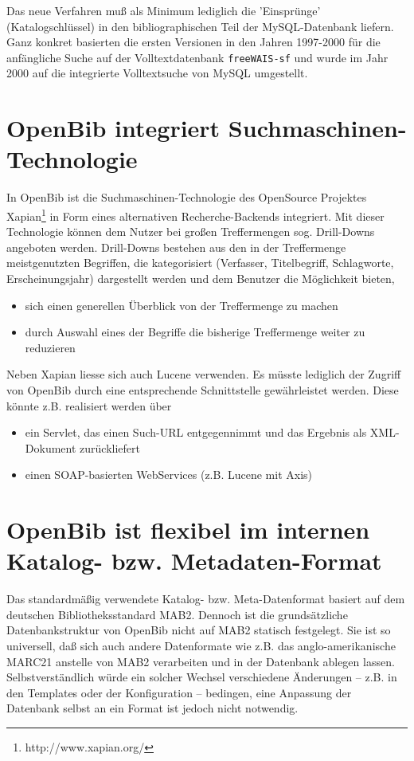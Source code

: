\documentclass[11pt, twoside, a4paper, BCOR8mm, DIV12, bibtotoc,idxtotoc]{scrbook}
\begin{document}
Das neue Verfahren muß als Minimum lediglich die 'Einsprünge'
(Katalogschlüssel) in den biblio\-gra\-phi\-schen Teil der MySQL-Datenbank
liefern. Ganz konkret basierten die ersten Versionen in den Jahren
1997-2000 für die anfängliche Suche auf der Volltextdatenbank
\texttt{freeWAIS-sf} und wurde im Jahr 2000 auf die integrierte
Volltextsuche von MySQL umgestellt.


\section{OpenBib integriert Suchmaschinen-Technologie}
In OpenBib ist die Suchmaschinen-Technologie des OpenSource Projektes
Xapian\footnote{http://www.xapian.org/} in Form eines alternativen
Recherche-Backends integriert. Mit dieser Technologie können dem Nutzer bei
großen Treffermengen sog. Drill-Downs angeboten werden. Drill-Downs
bestehen aus den in der Treffermenge meistgenutzten Begriffen, die
kategorisiert (Verfasser, Titelbegriff, Schlagworte, Erscheinungsjahr)
dargestellt werden und dem Benutzer die Möglichkeit bieten,
\begin{itemize}
\item sich einen generellen Überblick von der Treffermenge zu machen
\item durch Auswahl eines der Begriffe die bisherige Treffermenge
  weiter zu reduzieren 
\end{itemize}

Neben Xapian liesse sich auch Lucene verwenden. Es müsste lediglich
der Zugriff von OpenBib durch eine entsprechende Schnittstelle
gewährleistet werden. Diese könnte z.B. realisiert werden über


\begin{itemize}
\item ein Servlet, das einen Such-URL entgegennimmt und das Ergebnis
  als XML-Dokument zurückliefert
\item einen SOAP-basierten WebServices (z.B. Lucene mit Axis)
\end{itemize}

\section{OpenBib ist flexibel im internen Katalog- bzw. Metadaten-Format}
Das standardmäßig verwendete Katalog- bzw. Meta-Datenformat basiert
auf dem deutschen Bibliotheksstandard MAB2. Dennoch ist die
grundsätzliche Datenbankstruktur von OpenBib nicht auf MAB2 statisch
festgelegt. Sie ist so universell, daß sich auch andere Datenformate
wie z.B. das anglo-amerikanische MARC21 anstelle von MAB2 verarbeiten
und in der Datenbank ablegen lassen. Selbstverständlich würde ein
solcher Wechsel verschiedene Änderungen -- z.B. in den Templates oder
der Konfiguration -- bedingen, eine Anpassung der Datenbank selbst an
ein Format ist jedoch nicht notwendig.
\end{document}
